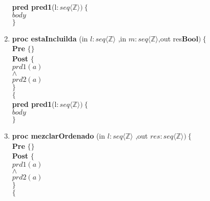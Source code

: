 \documentclass[a4paper]{article}
\begin{document}
\begin{enumerate}[label=\alph*)]
			\textbf{pred pred1}(l$: seq\langle \mathbb{Z}\rangle)\ \{$\smallskip \\
			\hspace*{6mm}$body$\\
			$\}$	
			
		\item
		
			\textbf{proc estaIncluilda }(in $l:seq\langle \mathbb{Z}\rangle$
				,in $m:seq\langle \mathbb{Z}\rangle$,out res$\textbf{Bool} )\ \{$\smallskip \\
			\hspace*{6mm} \textbf{Pre }$\{ \}$\smallskip \\
			\hspace*{6mm} \textbf{Post }$\{$\\
			\hspace*{6mm} $prd1(a)$\\
			\hspace*{6mm} $\wedge$\\
			\hspace*{6mm} $prd2(a)$\\
			\hspace*{6mm} $\}$\\
			$\{$\smallskip \\
			
			\textbf{pred pred1}(l$: seq\langle \mathbb{Z}\rangle)\ \{$\smallskip \\
			\hspace*{6mm}$body$\\
			$\}$	
			
		\item
			
			\textbf{proc mezclarOrdenado }(in $l:seq\langle \mathbb{Z}\rangle$
				,out $res:seq\langle \mathbb{Z}\rangle )\ \{$\smallskip \\
			\hspace*{6mm} \textbf{Pre }$\{ \}$\smallskip \\
			\hspace*{6mm} \textbf{Post }$\{$\\
			\hspace*{6mm} $prd1(a)$\\
			\hspace*{6mm} $\wedge$\\
			\hspace*{6mm} $prd2(a)$\\
			\hspace*{6mm} $\}$\\
			$\{$\smallskip \\
			

\end{enumerate}
\end{document}
